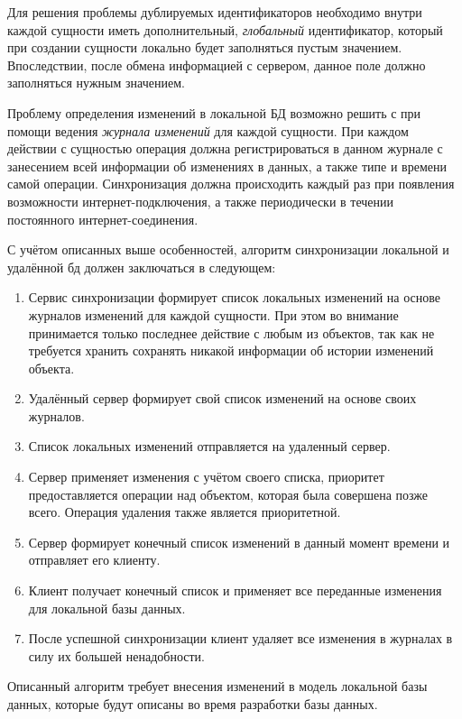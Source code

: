 Для решения проблемы дублируемых идентификаторов необходимо внутри каждой сущности иметь дополнительный, \emph{глобальный} идентификатор, который при создании сущности локально будет заполняться пустым значением.
Впоследствии, после обмена информацией с сервером, данное поле должно заполняться нужным значением.

Проблему определения изменений в локальной БД возможно решить с при помощи ведения \emph{журнала изменений} для каждой сущности.
При каждом действии с сущностью операция должна регистрироваться в данном журнале с занесением всей информации об изменениях в данных, а также типе и времени самой операции.
Синхронизация должна происходить каждый раз при появления возможности интернет-подключения, а также периодически в течении постоянного интернет-соединения.

С учётом описанных выше особенностей, алгоритм синхронизации локальной и удалённой бд должен заключаться в следующем:
\begin{enumerate}
    \item Сервис синхронизации формирует список локальных изменений на основе журналов изменений для каждой сущности.
    При этом во внимание принимается только последнее действие с любым из объектов, так как не требуется хранить сохранять никакой информации об истории изменений объекта.
    \item Удалённый сервер формирует свой список изменений на основе своих журналов.
    \item Список локальных изменений отправляется на удаленный сервер.
    \item Сервер применяет изменения с учётом своего списка, приоритет предоставляется операции над объектом, которая была совершена позже всего.
    Операция удаления также является приоритетной.
    \item Сервер формирует конечный список изменений в данный момент времени и отправляет его клиенту.
    \item Клиент получает конечный список и применяет все переданные изменения для локальной базы данных.
    \item После успешной синхронизации клиент удаляет все изменения в журналах в силу их большей ненадобности.
\end{enumerate}

Описанный алгоритм требует внесения изменений в модель локальной базы данных, которые будут описаны во время разработки базы данных.